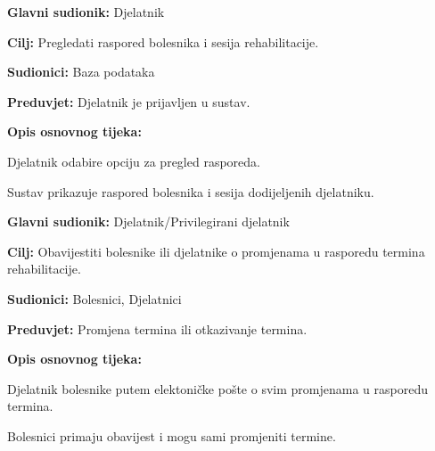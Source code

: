 \vspace{1em} %
\noindent{}
\begin{packed_item}
	\item \textbf{Glavni sudionik:} Djelatnik
	\item \textbf{Cilj:} Pregledati raspored bolesnika i sesija rehabilitacije.
	\item \textbf{Sudionici:} Baza podataka
	\item \textbf{Preduvjet:} Djelatnik je prijavljen u sustav.
	\item \textbf{Opis osnovnog tijeka:}
	\begin{packed_enum}
		\item Djelatnik odabire opciju za pregled rasporeda.
		\item Sustav prikazuje raspored bolesnika i sesija dodijeljenih djelatniku.
	\end{packed_enum}
\end{packed_item}

\vspace{1em} %
\noindent{}
\begin{packed_item}
	\item \textbf{Glavni sudionik:} Djelatnik/Privilegirani djelatnik
	\item \textbf{Cilj:} Obavijestiti bolesnike ili djelatnike o promjenama u rasporedu termina rehabilitacije.
	\item \textbf{Sudionici:} Bolesnici, Djelatnici
	\item \textbf{Preduvjet:} Promjena termina ili otkazivanje termina.
	\item \textbf{Opis osnovnog tijeka:}
	\begin{packed_enum}
		\item Djelatnik bolesnike putem elektoničke pošte o svim promjenama u rasporedu termina.
		\item Bolesnici primaju obavijest i mogu sami promjeniti termine.
	\end{packed_enum}
\end{packed_item}

